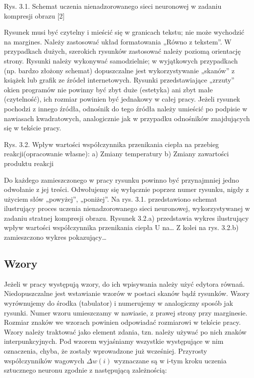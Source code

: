 Rys. 3.1. Schemat uczenia nienadzorowanego sieci neuronowej w zadaniu kompresji obrazu [2]

Rysunek musi być czytelny i mieścić się w granicach tekstu; nie może wychodzić na margines. Należy zastosować układ formatowania „Równo z tekstem”. W przypadkach dużych, szerokich rysunków zastosować należy poziomą orientację strony. Rysunki należy wykonywać samodzielnie; w wyjątkowych przypadkach (np. bardzo złożony schemat) dopuszczalne jest wykorzystywanie „skanów” z książek lub grafik ze źródeł internetowych. Rysunki przedstawiające „zrzuty” okien programów nie powinny być zbyt duże (estetyka) ani zbyt małe (czytelność), ich rozmiar powinien być jednakowy w całej pracy. Jeżeli rysunek pochodzi z innego źródła, odnośnik do tego źródła należy umieścić po podpisie w nawiasach kwadratowych, analogicznie jak w przypadku odnośników znajdujących się w tekście pracy.

Rys. 3.2. Wpływ wartości współczynnika przenikania ciepła na przebieg reakcji(opracowanie własne): a) Zmiany temperatury b) Zmiany zawartości produktu reakcji

Do każdego zamieszczonego w pracy rysunku powinno być przynajmniej jedno odwołanie z jej treści. Odwołujemy się wyłącznie poprzez numer rysunku, nigdy z użyciem słów „powyżej”, „poniżej”. Na rys. 3.1. przedstawiono schemat ilustrujący proces uczenia nienadzorowanego sieci neuronowej, wykorzystywanej w zadaniu stratnej kompresji obrazu. Rysunek 3.2.a) przedstawia wykres ilustrujący wpływ wartości współczynnika przenikania ciepła U na… Z kolei na rys. 3.2.b) zamieszczono wykres pokazujący…

\subsection{Wzory}

Jeżeli w pracy występują wzory, do ich wpisywania należy użyć edytora równań. Niedopuszczalne jest wstawianie wzorów w postaci skanów bądź rysunków. Wzory wyrównujemy do środka (tabulator) i numerujemy w analogiczny sposób jak rysunki. Numer wzoru umieszczamy w nawiasie, z prawej strony przy marginesie. Rozmiar znaków we wzorach powinien odpowiadać rozmiarowi w tekście pracy. Wzory należy traktować jako element zdania, tzn. należy używać po nich znaków interpunkcyjnych. Pod wzorem wyjaśniamy wszystkie występujące w nim oznaczenia, chyba, że zostały wprowadzone już wcześniej. Przyrosty współczynników wagowych $\Delta w(i)$ wyznaczane są w i-tym kroku uczenia sztucznego neuronu zgodnie z następującą zależnością:

